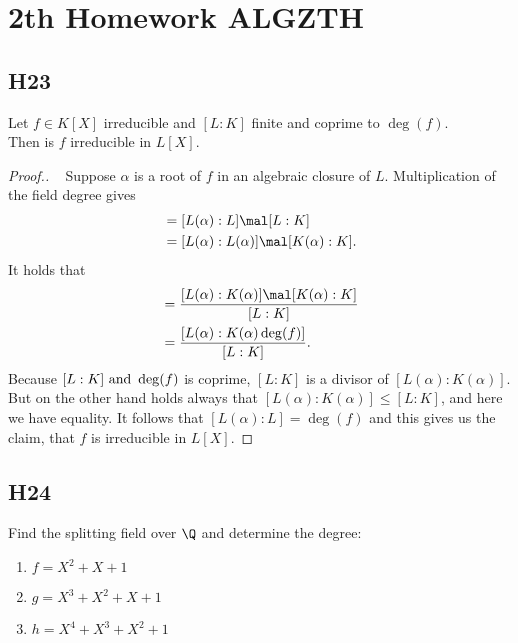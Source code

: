 
\section{2th Homework ALGZTH}
\subsection{H23}
Let $f \in K[X]$ irreducible and $[L:K]$ finite and coprime to $\deg(f)$.\\
Then is $f$ irreducible in $L[X]$.

\begin{proof}[Proof.]\ %
	Suppose $\alpha$ is a root of $f$ in an algebraic closure of $L$. Multiplication of the field degree gives
	\begin{align*}
		[L(\alpha):K] &= [L(\alpha): L] \mal [L:K]\\
		&= [L(\alpha):L(\alpha)]\mal [K(\alpha):K].
	\end{align*}
	It holds that
	\begin{align*}
		[L(\alpha):L] &= \frac{[L(\alpha):K(\alpha)]\mal [K(\alpha): K]}{[L:K]}\\
		&= \frac{[L(\alpha):K(\alpha)\deg(f)]}{[L:K]}.
	\end{align*}
	Because $[L:K] \text{ and } \deg(f)$ is coprime, $[L:K]$ is a divisor of $[L(\alpha):K(\alpha)]$. But on the other hand holds always that $[L(\alpha):K(\alpha)] \le [L:K]$, and here we have equality. It follows that $[L(\alpha):L] = \deg(f)$ and this gives us the claim, that $f$ is irreducible in $L[X]$.
\end{proof}

\subsection{H24}
Find the splitting field over $\Q$ and determine the degree: 
\begin{enumerate}
	\item $f = X^2 + X +1$
	\item $g = X^3 + X^2 + X + 1$
	\item $h = X^4 + X^3 + X^2 + 1$
\end{enumerate}

